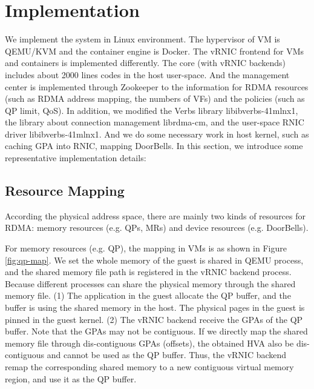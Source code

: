 \section{Implementation} \label{impl}
We implement the \sys system in Linux environment. The hypervisor of VM is QEMU/KVM and the container engine is Docker. The vRNIC frontend for VMs and containers is implemented differently. The \sys core (with vRNIC backends) includes about 2000 lines codes in the host user-space. And the management center is implemented through Zookeeper to the information for RDMA resources (such as RDMA address mapping, the numbers of VFs) and the policies (such as QP limit, QoS). In addition, we modified the Verbs library libibverbs-41mlnx1, the library about connection management librdma-cm, and the user-space RNIC driver libibverbs-41mlnx1. And we do some necessary work in host kernel, such as caching GPA into RNIC, mapping DoorBells. In this section, we introduce some representative implementation details:

\subsection{Resource Mapping}

According the physical address space, there are mainly two kinds of resources for RDMA: memory resources (e.g. QPs, MRs) and device resources (e.g. DoorBells). 


For memory resources (e.g. QP), the mapping in VMs is as shown in Figure \ref{fig:qp-map}. We set the whole memory of the guest is shared in QEMU process, and the shared memory file path is registered in the vRNIC backend process. Because different processes can share the physical memory through the shared memory file. (1) The application in the guest allocate the QP buffer, and the buffer is using the shared memory in the host. The physical pages in the guest is pinned in the guest kernel. (2) The vRNIC backend receive the GPAs of the QP buffer. Note that the GPAs may not be contiguous. If we directly map the shared memory file through dis-contiguous GPAs (offsets), the obtained HVA also be dis-contiguous and cannot be used as the QP buffer. Thus, the vRNIC backend remap the corresponding shared memory to a new contiguous virtual memory region, and use it as the QP buffer.

